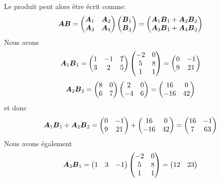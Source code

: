  Le produit peut alors être écrit comme:
 \[
 \boldsymbol{A}\boldsymbol{B} = \begin{pmatrix}
 \boldsymbol{A}_1 & \boldsymbol{A}_2 \\
 \boldsymbol{A}_3 & \boldsymbol{A}_4
 \end{pmatrix}
 \begin{pmatrix}
 \boldsymbol{B}_1\\ \boldsymbol{B}_2
 \end{pmatrix}
 = \begin{pmatrix}
 \boldsymbol{A}_1\boldsymbol{B}_1 + \boldsymbol{A}_2 \boldsymbol{B}_2\\
 \boldsymbol{A}_3\boldsymbol{B}_1 + \boldsymbol{A}_4 \boldsymbol{B}_2
 \end{pmatrix}
 \]
 Nous avons
 \[
 \boldsymbol{A}_1\boldsymbol{B}_1 = \begin{pmatrix}
 1 & -1 & 7 \\
 3 & 2 & 5
 \end{pmatrix}
 \begin{pmatrix}
 -2 & 0 \\
 5 & 8 \\
 1 & 1
 \end{pmatrix}
 =
 \begin{pmatrix}
 0 & -1 \\
 9 & 21
 \end{pmatrix}
 \]
 \[
 \boldsymbol{A}_2\boldsymbol{B}_2 = \begin{pmatrix}
 8 & 0 \\
 6 & 7
 \end{pmatrix}
 \begin{pmatrix}
 2 & 0 \\
 -4 & 6
 \end{pmatrix}
 = \begin{pmatrix}
 16 & 0 \\
 -16 & 42
 \end{pmatrix}
 \]
 et donc
 \[
 \boldsymbol{A}_1\boldsymbol{B}_1 + \boldsymbol{A}_2\boldsymbol{B}_2 = 
 \begin{pmatrix}
  0 & -1 \\
 9 & 21
 \end{pmatrix}
 +
 \begin{pmatrix}
 16 & 0 \\
 -16 & 42
 \end{pmatrix}
 = \begin{pmatrix}
 16 & -1 \\
7 & 63
 \end{pmatrix}
 \]
 Nous avons également
 \[
 \boldsymbol{A}_3\boldsymbol{B}_1 = \begin{pmatrix}
 1 & 3 & -1
 \end{pmatrix}
  \begin{pmatrix}
 -2 & 0 \\
 5 & 8 \\
 1 & 1
 \end{pmatrix}
 = \begin{pmatrix}
 12 & 23
 \end{pmatrix}
 \]
